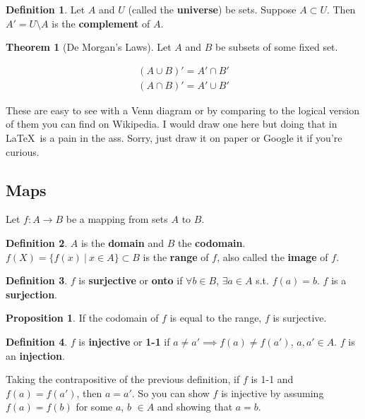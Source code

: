 \documentclass{article}
\theoremstyle{definition}
\newtheorem{definition}{Definition}[section]
\newtheorem{proposition}{Proposition}[section]
\newtheorem{theorem}{Theorem}[section]
\begin{document}
\begin{definition}
Let $A$ and $U$ (called the \textbf{universe}) be sets. Suppose $A \subset U$. Then $A' = U \setminus A$ is the \textbf{complement} of $A$.
\end{definition}

\begin{theorem}[De Morgan's Laws]
Let $A$ and $B$ be subsets of some fixed set.

\begin{align*}
(A \cup B)' = A' \cap B' \\
(A \cap B)' = A' \cup B'
\end{align*}
\end{theorem}

These are easy to see with a Venn diagram or by comparing to the logical version of them you can find on Wikipedia. I would draw one here but doing that in \LaTeX \ is a pain in the ass. Sorry, just draw it on paper or Google it if you're curious.

\subsection{Maps}

Let $f: A \rightarrow B$ be a mapping from sets $A$ to $B$.

\begin{definition}
$A$ is the \textbf{domain} and $B$ the \textbf{codomain}. $f(X) = \{f(x) \ | \ x \in A\} \subset B$ is the \textbf{range} of $f$, also called the \textbf{image} of $f$.
\end{definition}

\begin{definition}
$f$ is \textbf{surjective} or \textbf{onto} if $\forall b \in B$, $\exists a \in A$ s.t. $f(a) = b$. $f$ is a \textbf{surjection}.
\end{definition}

\begin{proposition}
If the codomain of $f$ is equal to the range, $f$ is surjective.
\end{proposition}

\begin{definition}
$f$ is \textbf{injective} or \textbf{1-1} if $a \neq a' \implies f(a) \neq f(a')$, $a, a' \in A$. $f$ is an \textbf{injection}.
\end{definition}

Taking the contrapositive of the previous definition, if $f$ is 1-1 and $f(a) = f(a')$, then $a = a'$. So you can show $f$ is injective by assuming $f(a) = f(b)$ for some $a$, $b$ $\in A$ and showing that $a = b$.
\end{document}
